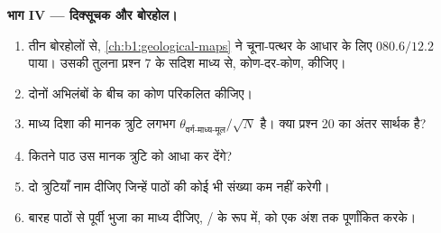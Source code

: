 \begin{problem}
\medskip
\noindent\textbf{भाग IV --- दिक्सूचक और बोरहोल।}
\begin{enumerate}[resume]
  \item तीन बोरहोलों से, \cref{ch:b1:geological-maps} ने चूना-पत्थर के आधार के लिए  $080.6/12.2$ पाया। उसकी तुलना
        प्रश्न 7 के सदिश माध्य से, कोण-दर-कोण, कीजिए।
  \item दोनों अभिलंबों के बीच का कोण परिकलित कीजिए।
  \item माध्य दिशा की मानक त्रुटि लगभग $\theta_{\text{वर्ग-माध्य-मूल}}/\sqrt N$ है। क्या प्रश्न 20 का अंतर सार्थक है?
  \item कितने पाठ उस मानक त्रुटि को आधा कर देंगे?
  \item दो त्रुटियाँ नाम दीजिए जिन्हें पाठों की कोई भी संख्या कम नहीं करेगी।
  \item बारह पाठों से पूर्वी भुजा का माध्य  दीजिए, / के रूप में,  को एक अंश तक पूर्णांकित करके।
\end{enumerate}
\end{problem}
